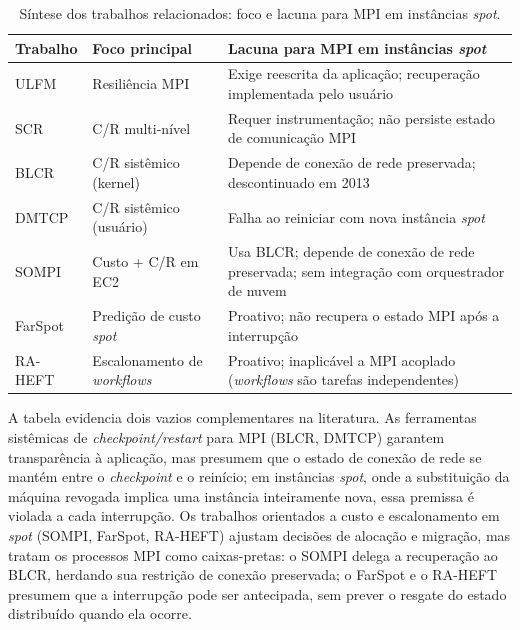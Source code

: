 \begin{table}[htb]
  \centering
  \caption{Síntese dos trabalhos relacionados: foco e lacuna para MPI em
           instâncias \textit{spot}.}
  \label{tab:rel-comparacao}
  {\small
  \begin{tabular}{l p{4.4cm} p{6.8cm}}
    \toprule
    \textbf{Trabalho} & \textbf{Foco principal} &
      \textbf{Lacuna para MPI em instâncias \textit{spot}} \\
    \midrule
    ULFM    & Resiliência MPI               & Exige reescrita da aplicação; recuperação implementada pelo usuário \\
    SCR     & C/R multi-nível               & Requer instrumentação; não persiste estado de comunicação MPI \\
    BLCR    & C/R sistêmico (kernel)        & Depende de conexão de rede preservada; descontinuado em 2013 \\
    DMTCP   & C/R sistêmico (usuário)       & Falha ao reiniciar com nova instância \textit{spot} \\
    SOMPI   & Custo + C/R em EC2            & Usa BLCR; depende de conexão de rede preservada; sem integração com orquestrador de nuvem \\
    FarSpot & Predição de custo \textit{spot} & Proativo; não recupera o estado MPI após a interrupção \\
    RA-HEFT & Escalonamento de \textit{workflows} & Proativo; inaplicável a MPI acoplado (\textit{workflows} são tarefas independentes) \\
    \bottomrule
  \end{tabular}
  }
\end{table}

A tabela evidencia dois vazios complementares na literatura. As ferramentas
sistêmicas de \textit{checkpoint/restart} para MPI (BLCR, DMTCP) garantem
transparência à aplicação, mas presumem que o estado de conexão de rede se
mantém entre o \textit{checkpoint} e o reinício; em instâncias \textit{spot},
onde a substituição da máquina revogada implica uma instância inteiramente
nova, essa premissa é violada a cada interrupção. Os trabalhos orientados a
custo e escalonamento em \textit{spot} (SOMPI, FarSpot, RA-HEFT) ajustam
decisões de alocação e migração, mas tratam os processos MPI como
caixas-pretas: o SOMPI delega a recuperação ao BLCR, herdando sua restrição
de conexão preservada; o FarSpot e o RA-HEFT presumem que a interrupção pode
ser antecipada, sem prever o resgate do estado distribuído quando ela ocorre.

